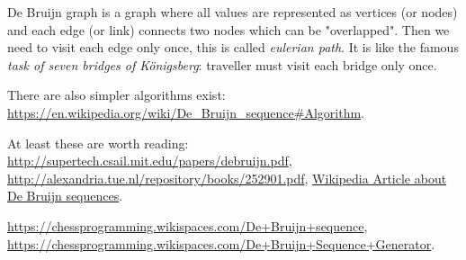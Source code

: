 
De Bruijn graph is a graph where all values are represented as vertices (or nodes) and each edge (or link) connects two nodes which can be "overlapped".
Then we need to visit each edge only once, this is called \textit{eulerian path}.
It is like the famous \textit{task of seven bridges of Königsberg}:
traveller must visit each bridge only once.

There are also simpler algorithms exist: \url{https://en.wikipedia.org/wiki/De_Bruijn_sequence\#Algorithm}.


At least these are worth reading:
\url{http://supertech.csail.mit.edu/papers/debruijn.pdf},
\url{http://alexandria.tue.nl/repository/books/252901.pdf},
\href{https://en.wikipedia.org/wiki/De_Bruijn_sequence}{Wikipedia Article about De Bruijn sequences}.

\url{https://chessprogramming.wikispaces.com/De+Bruijn+sequence},
\url{https://chessprogramming.wikispaces.com/De+Bruijn+Sequence+Generator}.

\levelup{}

